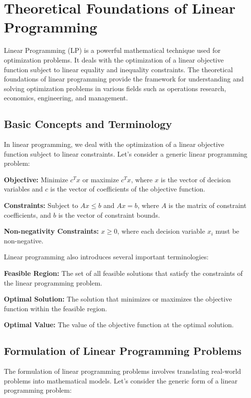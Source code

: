 \documentclass[12pt]{book} %
\begin{document}
\section{Theoretical Foundations of Linear Programming}
Linear Programming (LP) is a powerful mathematical technique used for optimization problems. It deals with the optimization of a linear objective function subject to linear equality and inequality constraints. The theoretical foundations of linear programming provide the framework for understanding and solving optimization problems in various fields such as operations research, economics, engineering, and management.

\subsection{Basic Concepts and Terminology}
In linear programming, we deal with the optimization of a linear objective function subject to linear constraints. Let's consider a generic linear programming problem:

\textbf{Objective:} Minimize \( c^Tx \) or maximize \( c^Tx \), where \( x \) is the vector of decision variables and \( c \) is the vector of coefficients of the objective function.

\textbf{Constraints:} Subject to \( Ax \leq b \) and \( Ax = b \), where \( A \) is the matrix of constraint coefficients, and \( b \) is the vector of constraint bounds.

\textbf{Non-negativity Constraints:} \( x \geq 0 \), where each decision variable \( x_i \) must be non-negative.

Linear programming also introduces several important terminologies:

\textbf{Feasible Region:} The set of all feasible solutions that satisfy the constraints of the linear programming problem.

\textbf{Optimal Solution:} The solution that minimizes or maximizes the objective function within the feasible region.

\textbf{Optimal Value:} The value of the objective function at the optimal solution.

\subsection{Formulation of Linear Programming Problems}
The formulation of linear programming problems involves translating real-world problems into mathematical models. Let's consider the generic form of a linear programming problem:
\end{document}
